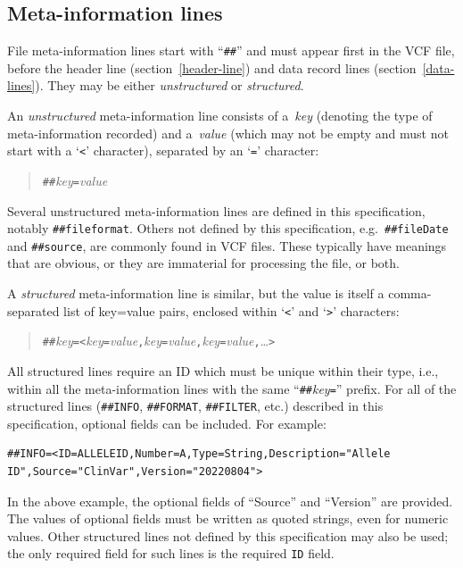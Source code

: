 \documentclass[8pt]{article}
\begin{document}
\subsection{Meta-information lines}
File meta-information lines start with ``\verb|##|'' and must appear first in the VCF file, before the header line (section~\ref{header-line}) and data record lines (section~\ref{data-lines}).
They may be either \emph{unstructured} or \emph{structured}.

An \emph{unstructured} meta-information line consists of a~\emph{key} (denoting the type of meta-information recorded) and a~\emph{value} (which may not be empty and must not start with a `\verb|<|' character), separated by an `\verb|=|' character:
\begin{quote}
\verb|##|\emph{key}\verb|=|\emph{value}
\end{quote}
Several unstructured meta-information lines are defined in this specification, notably \verb|##fileformat|.
Others not defined by this specification, e.g.\ \verb|##fileDate| and \verb|##source|, are commonly found in VCF files.
These typically have meanings that are obvious, or they are immaterial for processing the file, or both.

A \emph{structured} meta-information line is similar, but the value is itself a comma-separated list of key=value pairs, enclosed within `\verb|<|' and `\verb|>|' characters:
\begin{quote}
\verb|##|\emph{key}\verb|=<|\emph{key}\verb|=|\emph{value}\verb|,|\emph{key}\verb|=|\emph{value}\verb|,|\emph{key}\verb|=|\emph{value}\verb|,|\ldots\verb|>|
\end{quote}
All structured lines require an ID which must be unique within their type, i.e., within all the meta-information lines with the same ``\verb|##|\emph{key}\verb|=|'' prefix.
For all of the structured lines (\verb|##INFO|, \verb|##FORMAT|, \verb|##FILTER|, etc.) described in this specification, optional fields can be included.
For example:
\begin{verbatim}
##INFO=<ID=ALLELEID,Number=A,Type=String,Description="Allele ID",Source="ClinVar",Version="20220804">
\end{verbatim}
In the above example, the optional fields of ``Source'' and ``Version'' are provided.
The values of optional fields must be written as quoted strings, even for numeric values.
Other structured lines not defined by this specification may also be used; the only required field for such lines is the required \verb|ID| field.
\end{document}
